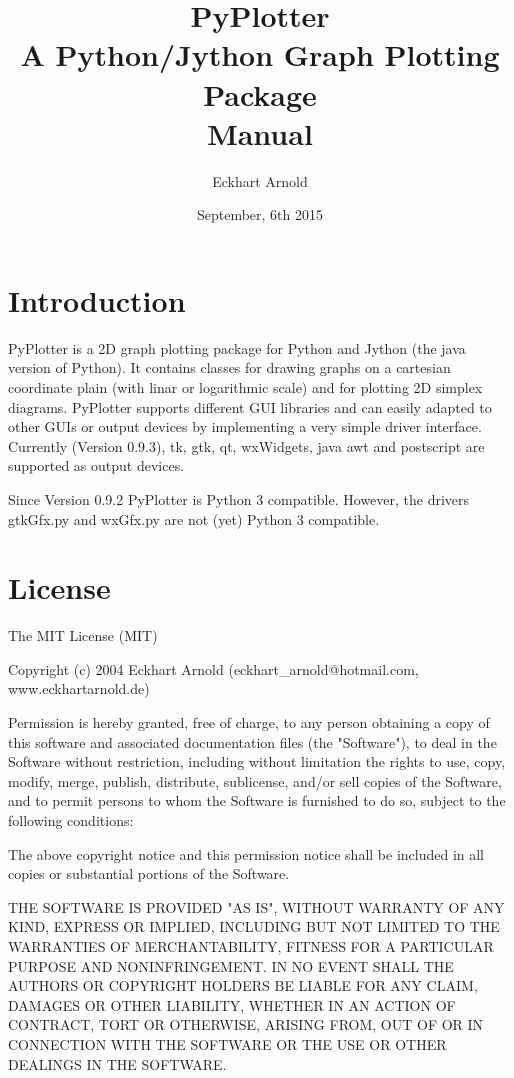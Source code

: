 \documentclass[12pt,a4paper,USenglish]{article}
\begin{document}
\title{PyPlotter\\A Python/Jython Graph Plotting Package\\Manual}
\author{Eckhart Arnold}
\date{September, 6th 2015}

\maketitle

\tableofcontents{}

\newpage

\section{Introduction}

{\sf PyPlotter} is a 2D graph plotting package for Python and Jython
(the java version of Python). It contains classes for drawing graphs
on a cartesian coordinate plain (with linar or logarithmic scale) and
for plotting 2D simplex diagrams. {\sf PyPlotter} supports different
GUI libraries and can easily adapted to other GUIs or output devices
by implementing a very simple driver interface. Currently (Version
0.9.3), tk, gtk, qt, wxWidgets, java awt and postscript are supported as
output devices.

Since Version 0.9.2 PyPlotter is Python 3 compatible. However, the drivers
gtkGfx.py and wxGfx.py are not (yet) Python 3 compatible.

\section{License }

The MIT License (MIT)

Copyright (c) 2004 Eckhart Arnold (eckhart\_arnold@hotmail.com, www.eckhartarnold.de)

Permission is hereby granted, free of charge, to any person obtaining a copy
of this software and associated documentation files (the "Software"), to deal
in the Software without restriction, including without limitation the rights
to use, copy, modify, merge, publish, distribute, sublicense, and/or sell
copies of the Software, and to permit persons to whom the Software is
furnished to do so, subject to the following conditions:

The above copyright notice and this permission notice shall be included in
all copies or substantial portions of the Software.

THE SOFTWARE IS PROVIDED "AS IS", WITHOUT WARRANTY OF ANY KIND, EXPRESS OR
IMPLIED, INCLUDING BUT NOT LIMITED TO THE WARRANTIES OF MERCHANTABILITY,
FITNESS FOR A PARTICULAR PURPOSE AND NONINFRINGEMENT. IN NO EVENT SHALL THE
AUTHORS OR COPYRIGHT HOLDERS BE LIABLE FOR ANY CLAIM, DAMAGES OR OTHER
LIABILITY, WHETHER IN AN ACTION OF CONTRACT, TORT OR OTHERWISE, ARISING FROM,
OUT OF OR IN CONNECTION WITH THE SOFTWARE OR THE USE OR OTHER DEALINGS IN
THE SOFTWARE.
\end{document}
